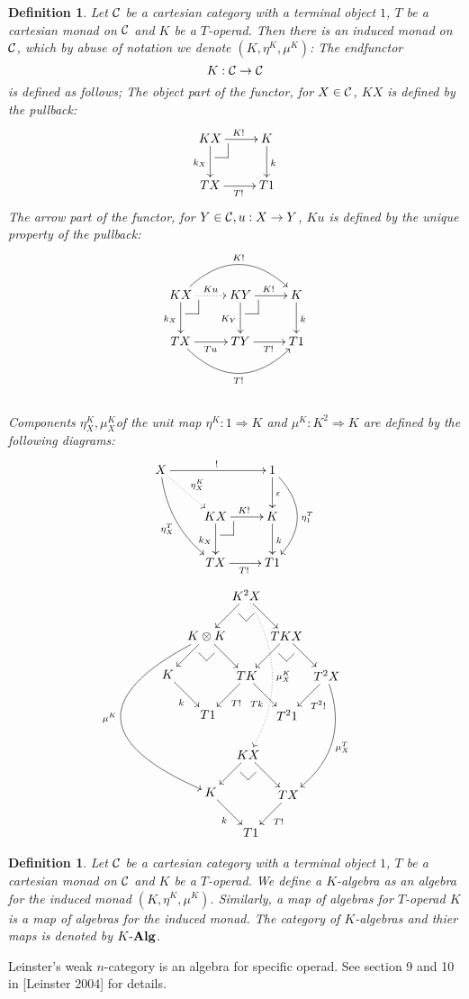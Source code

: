 \documentclass[12pt]{article}
\makeatletter
\theoremstyle{plain}
\newtheorem{definition}[theorem]{Definition}
\theoremstyle{definition}
\newcommand{\pullbackmark}[2]{\save ;p+<.8pc,0pc>:(0,-1)::%
(#1) *{\phantom{Z}} %
;p+(#2)-(0,0) **@{-}%
;p-(#1)+(0,0) *{\phantom{Z}} **@{-} \restore}
\makeatother
\begin{document}
\begin{definition}
Let ${\cal C}$ be a cartesian category with a terminal object $1$, $T$ be a cartesian monad on ${\cal C}$ and $K$ be a $T$-operad. Then there is an {\em induced monad} on ${\cal C}$, which by abuse of notation we denote $(K, \eta^K, \mu^K)$: The endfunctor
\[
K: {\cal C} \rightarrow {\cal C}
\]
is defined as follows; The object part of the functor, for $X \in {\cal C}$, $KX$ is defined by the pullback:
\[ \xymatrix{
KX \ar[r]^{K!} \ar[d]_{k_X} \pullbackmark{0,1.5}{1.5,0} & K \ar[d]^k \\
TX \ar[r]_{T!} & T1
} \]
The arrow part of the functor, for $Y \in {\cal C}, u: X \rightarrow Y$, $Ku$ is defined by the unique property of the pullback: \vspace{5pt}
\[ \xymatrix{
KX \ar@{.>}[r]^{Ku} \ar[d]_{k_X} \pullbackmark{0,1.5}{1.5,0} \ar@/^25pt/[rr]^{K!} & KY \ar[r]^{K!} \ar[d]_{K_Y} \pullbackmark{0,1.5}{1.5,0} & K \ar[d]^{k} \\
TX \ar[r]_{Tu} \ar@/_25pt/[rr]_{T!} & TY \ar[r]_{T!} & T1
} \] \vspace{10pt} \\
Components  $\eta^K_X, \mu^K_X$of the unit map $\eta^K: 1 \Rightarrow K$ and $\mu^K:K^2 \Rightarrow K$ are defined by the following diagrams: 
\[ \xymatrix{
X \ar@{.>}[rd]^{\eta^K_X} \ar[rr]^{!} \ar@/_10pt/[rdd]_{\eta^T_X} & & 1 \ar[d]^{\epsilon} \ar@/^20pt/[dd]^{\eta^T_1} \\
& KX \ar[r]^{K!} \ar[d]_{k_X} \pullbackmark{0,1.5}{1.5,0} & K \ar[d]^k \\
& TX \ar[r]_{T!} & T1
} \]
\[ \xymatrix@dr{
K^2 X \ar[r] \ar[d] \pullbackmark{1,1}{-1,1} \ar@{.>}@/^20pt/[rrdd]^{\mu^K_X} & TKX \ar[r] \ar[d] \pullbackmark{1,1}{-1,1} & T^2 X \ar[d]^{T^2 !} \ar@/^20pt/[rdd]^{\mu^T_X} & \\
K \otimes K \ar[r] \ar[d] \pullbackmark{1,1}{-1,1} \ar@/_70pt/[rrdd]_{\mu^K} & TK \ar[r]_{Tk} \ar[d]^{T!} & T^2 1 & \\
K \ar[r]_k & T1 & KX \ar[r] \ar[d] \pullbackmark{1,1}{-1,1} & TX \ar[d]^{T!} \\
& & K \ar[r]_{k} & T1 
} \]
\end{definition}

\begin{definition}
Let ${\cal C}$ be a cartesian category with a terminal object $1$, $T$ be a cartesian monad on ${\cal C}$ and $K$ be a $T$-operad. We define a \emph{$K$-algebra} as an algebra for the induced monad $(K, \eta^K , \mu^K )$. Similarly, a \emph{map} of algebras for $T$-operad $K$ is a map of algebras for the induced monad. The category of $K$-algebras and thier maps is denoted by $K \mathchar`- {\bf Alg}$.
\end{definition}
\noindent
Leinster's weak $n$-category is an algebra for specific operad. See section 9 and 10 in [Leinster 2004] for details.
\end{document}
